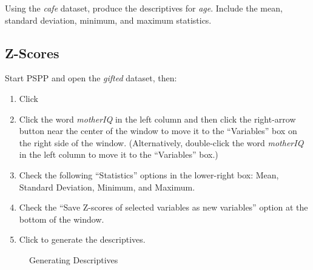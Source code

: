 Using the \textit{cafe} dataset, produce the descriptives for \textit{age}. Include the mean, standard deviation, minimum, and maximum statistics.

\subsection{Z-Scores}

Start \acs{PSPP} and open the \textit{gifted} dataset, then:

\begin{enumerate}
  \item Click \textsc{}
  \item Click the word \textit{motherIQ} in the left column and then click the right-arrow button near the center of the window to move it to the ``Variables'' box on the right side of the window. (Alternatively, double-click the word \textit{motherIQ} in the left column to move it to the ``Variables'' box.)
  \item Check the following ``Statistics'' options in the lower-right box: Mean, Standard Deviation, Minimum, and Maximum.
  \item Check the ``Save Z-scores of selected variables as new variables'' option at the bottom of the window.
  \item Click  to generate the descriptives.
\end{enumerate}

\begin{figure}[H]
  \begin{center}
    \caption{Generating Descriptives}
    \label{lab04_fig03}
  \end{center}
\end{figure}

